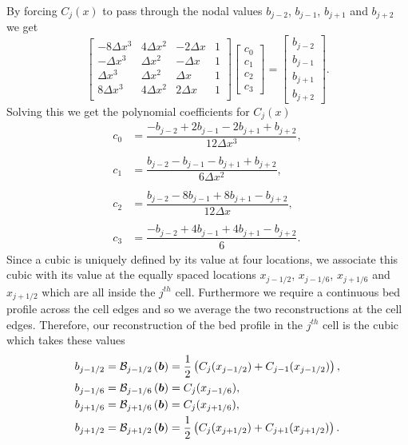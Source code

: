 By forcing $C_j(x)$ to pass through the nodal values $b_{j-2}$, $b_{j-1}$, $b_{j+1}$ and $b_{j+2}$ we get
\begin{equation*}
\begin{bmatrix}
-8\Delta x^3 & 4\Delta x^2  & -2\Delta x & 1\\
-\Delta x^3 & \Delta x^2  &-\Delta x & 1\\
\Delta x^3 & \Delta x^2  & \Delta x & 1\\
8\Delta x^3 & 4\Delta x^2  & 2\Delta x & 1\\
\end{bmatrix}
\begin{bmatrix}
c_0 \\ c_1 \\ c_2 \\ c_3\end{bmatrix} =  \begin{bmatrix}
b_{j-2} \\ b_{j-1}\\ b_{j+1} \\ b_{j+2}
\end{bmatrix}.
\end{equation*}
Solving this we get the polynomial coefficients for $C_j(x)$
\begin{align*}
c_0 &=  \dfrac{-b_{j-2} + 2b_{j-1} - 2 b_{j+1} + b_{j+2}}{12 \Delta x^3},\\ \\
c_1 &=  \dfrac{b_{j-2} - b_{j-1} - b_{j+1} + b_{j+2}}{6 \Delta x^2},\\ \\
c_2 &=  \dfrac{b_{j-2} - 8b_{j-1} + 8 b_{j+1} - b_{j+2}}{12 \Delta x},\\ \\
c_3 &=  \dfrac{-b_{j-2}  + 4b_{j-1} + 4 b_{j+1} - b_{j+2}}{6}.
\end{align*}
Since a cubic is uniquely defined by its value at four locations, we associate this cubic with its value at the equally spaced locations $x_{j-1/2}$, $x_{j-1/6}$, $x_{j+1/6}$ and $x_{j+1/2}$ which are all inside the $j^{th}$ cell. Furthermore we require a continuous bed profile across the cell edges and so we average the two reconstructions at the cell edges. Therefore, our reconstruction of the bed profile in the $j^{th}$ cell is the cubic which takes these values
\begin{subequations}
\begin{align}
b_{j-1/2} &=  \mathcal{B}_{j-1/2}\left(\boldsymbol{b}\right) =  \frac{1}{2}\left( C_j(x_{j-1/2}) + C_{j-1}(x_{j-1/2})\right),\\
b_{j-1/6} &=  \mathcal{B}_{j-1/6}\left(\boldsymbol{b}\right) =  C_j(x_{j-1/6}),\\
b_{j+1/6} &=  \mathcal{B}_{j+1/6}\left(\boldsymbol{b}\right) =  C_j(x_{j+1/6}),\\
b_{j+1/2} &=  \mathcal{B}_{j+1/2}\left(\boldsymbol{b}\right) =  \frac{1}{2}\left( C_j(x_{j+1/2}) + C_{j+1}(x_{j+1/2})\right).
\end{align}
\label{eqn:FEVMbedrecon}
\end{subequations}


